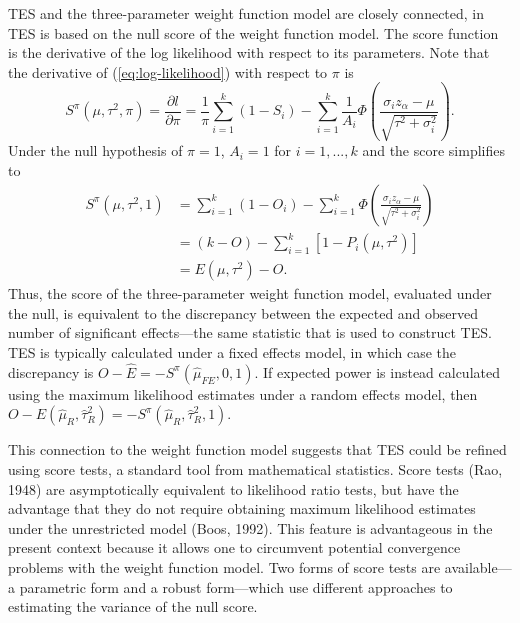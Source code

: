 \documentclass[man,floatsintext]{apa6}
\begin{document}
TES and the three-parameter weight function model are closely connected, in TES is based on the null score of the weight function model.
The score function is the derivative of the log likelihood with respect to its parameters.
Note that the derivative of (\ref{eq:log-likelihood}) with respect to \(\pi\) is
\begin{equation}
S^\pi(\mu, \tau^2, \pi) = \frac{\partial l}{\partial \pi} = \frac{1}{\pi} \sum_{i=1}^k (1 - S_i) - \sum_{i=1}^k \frac{1}{A_i} \Phi\left( \frac{\sigma_i z_\alpha - \mu}{\sqrt{\tau^2 + \sigma_i^2}}\right).
\label{eq:score-pi}
\end{equation}
Under the null hypothesis of \(\pi = 1\), \(A_i = 1\) for \(i = 1,...,k\) and the score simplifies to
\[
\begin{aligned}
S^\pi(\mu, \tau^2, 1) &= \sum_{i=1}^k (1 - O_i) - \sum_{i=1}^k \Phi\left( \frac{\sigma_i z_\alpha - \mu}{\sqrt{\tau^2 + \sigma_i^2}}\right) \\
&= (k - O) - \sum_{i=1}^k \left[1 - P_i(\mu, \tau^2)\right] \\
&= E(\mu,\tau^2) - O.
\end{aligned}
\]
Thus, the score of the three-parameter weight function model, evaluated under the null, is equivalent to the discrepancy between the expected and observed number of significant effects---the same statistic that is used to construct TES.
TES is typically calculated under a fixed effects model, in which case the discrepancy is \(O - \hat{E} = - S^\pi(\hat\mu_{FE}, 0, 1)\). If expected power is instead calculated using the maximum likelihood estimates under a random effects model, then \(O - E(\hat\mu_R, \hat\tau^2_R) = - S^\pi(\hat\mu_R, \hat\tau^2_R, 1)\).

This connection to the weight function model suggests that TES could be refined using score tests, a standard tool from mathematical statistics. Score tests (Rao, 1948) are asymptotically equivalent to likelihood ratio tests, but have the advantage that they do not require obtaining maximum likelihood estimates under the unrestricted model (Boos, 1992). This feature is advantageous in the present context because it allows one to circumvent potential convergence problems with the weight function model. Two forms of score tests are available---a parametric form and a robust form---which use different approaches to estimating the variance of the null score.
\end{document}
